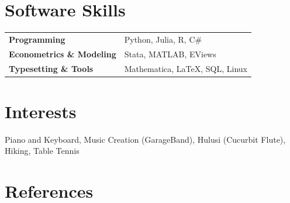 \documentclass[a4paper,12pt]{article}
\begin{document}
\section{Software Skills}
\begin{tabularx}{\linewidth}{@{}l X@{}}
\textbf{Programming}  &  \hfill \normalsize{Python, Julia, R, C\#}\\ 
\textbf{Econometrics \& Modeling}  & \hfill \normalsize{Stata, MATLAB, EViews}\\ 
\textbf{Typesetting \& Tools}  & \hfill \normalsize{Mathematica, \LaTeX, SQL, Linux}
\end{tabularx} %




\section{Interests}

Piano and Keyboard, Music Creation (GarageBand), Hulusi (Cucurbit Flute), Hiking, Table Tennis





\section{References}
\end{document}
